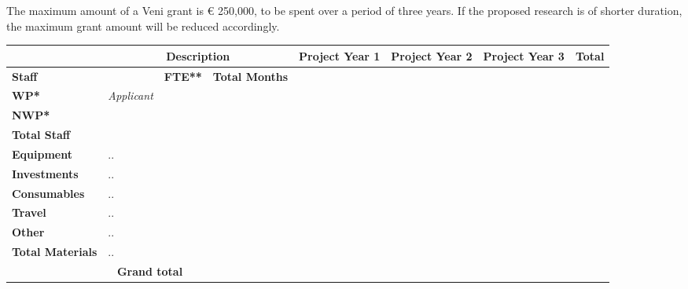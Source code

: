 \documentclass[10pt]{article}
\newcommand{\tableheadfont}{\bfseries\fontsize{10}{10}\selectfont\leavevmode\color{tableblue}}
\begin{document}
	The maximum amount of a Veni grant is € 250,000, to be spent over a period of three years. If the proposed research is of shorter duration, the maximum grant amount will be reduced accordingly.
	
	\vspace{0.4cm}
	\noindent
	{\renewcommand{\arraystretch}{1.5}
	\begin{tabularx}{\linewidth}{|p{2.5cm}|p{1.5cm}|p{1.5cm}|p{1.5cm}|X|X|X|X|}
		\arrayrulecolor[gray]{0.4}\hline
		{\rowcolor[gray]{0.95}} & \multicolumn{3}{c|}{\tableheadfont Description}  & {\tableheadfont Project Year 1} & {\tableheadfont Project Year 2}  & {\tableheadfont Project Year 3} & {\tableheadfont Total} \\\hline
		{\cellcolor[gray]{0.95}\tableheadfont Staff} & {\cellcolor[gray]{0.95} } & {\cellcolor[gray]{0.95}\tableheadfont FTE**} & {\cellcolor[gray]{0.95}\tableheadfont Total Months} & & & & \\\hline
		{\cellcolor[gray]{0.95}\tableheadfont WP*} & \textit{Applicant} & &  & & & & \\\hline
		{\cellcolor[gray]{0.95}\tableheadfont NWP*} & & &  & & & & \\\hline
		{\cellcolor[gray]{0.95}\tableheadfont Total Staff} & & &  & & & & \\\hline
		{\cellcolor[gray]{0.95}\tableheadfont Equipment} & \multicolumn{3}{l|}{..} & & & & \\\hline
		{\cellcolor[gray]{0.95}\tableheadfont Investments} & \multicolumn{3}{l|}{..} & & & & \\\hline
		{\cellcolor[gray]{0.95}\tableheadfont Consumables} & \multicolumn{3}{l|}{..} & & & & \\\hline
		{\cellcolor[gray]{0.95}\tableheadfont Travel} & \multicolumn{3}{l|}{..} & & & & \\\hline
		{\cellcolor[gray]{0.95}\tableheadfont Other} & \multicolumn{3}{l|}{..} & & & & \\\hline
		{\cellcolor[gray]{0.95}\tableheadfont Total Materials} & \multicolumn{3}{l|}{..} & & & & \\\hline
		\multicolumn{4}{c|}{\cellcolor[gray]{0.95}\tableheadfont Grand total} & & & & \\\hline
	\end{tabularx}
	}
	
\end{document}
